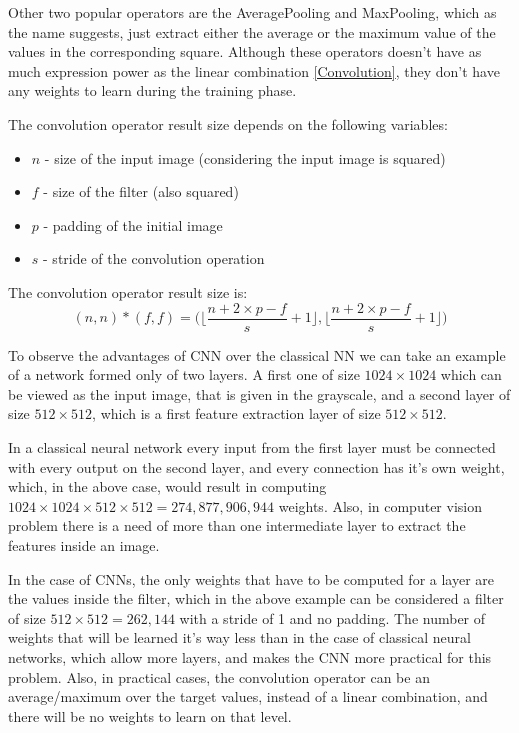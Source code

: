 Other two popular operators are the AveragePooling and MaxPooling, which as the name suggests, just extract either the average or the maximum value of the values in the corresponding square. Although these operators doesn't have as much expression power as the linear combination \ref{Convolution}, they don't have any weights to learn during the training phase.

The convolution operator result size depends on the following variables:
\begin{itemize}
	\item $n$ - size of the input image (considering the input image is squared)
	\item $f$ - size of the filter (also squared)
	\item $p$ - padding of the initial image
	\item $s$ - stride of the convolution operation
\end{itemize}
The convolution operator result size is:
$$ (n, n) * (f, f) = \bigg( \bigg\lfloor \frac{n + 2 \times p - f}{s} + 1 \bigg\rfloor , \bigg\lfloor \frac{n + 2 \times p - f}{s} + 1 \bigg\rfloor \bigg)$$

To observe the advantages of CNN over the classical NN we can take an example of a network formed only of two layers. A first one of size $1024\times1024$ which can be viewed as the input image, that is given in the grayscale, and a second layer of size $512\times512$, which is a first feature extraction layer of size $512\times512$.

In a classical neural network every input from the first layer must be connected with every output on the second layer, and every connection has it's own weight, which, in the above case, would result in computing $1024 \times 1024 \times 512 \times 512 = 274,877,906,944$ weights. Also, in computer vision problem there is a need of more than one intermediate layer to extract the features inside an image.

In the case of CNNs, the only weights that have to be computed for a layer are the values inside the filter, which in the above example can be considered a filter of size $512 \times 512 = 262,144‬$ with a stride of 1 and no padding. The number of weights that will be learned it's way less than in the case of classical neural networks, which allow more layers, and makes the CNN more practical for this problem. Also, in practical cases, the convolution operator can be an average/maximum over the target values, instead of a linear combination, and there will be no weights to learn on that level.


